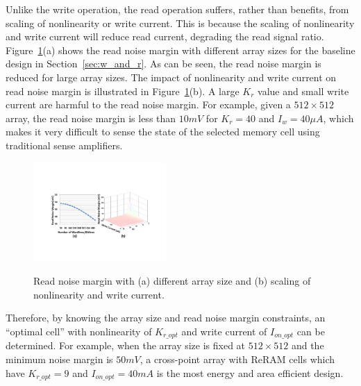 Unlike the write operation, the read operation suffers, rather than
benefits, from scaling of nonlinearity or write current. This is because
the scaling of nonlinearity and write current will reduce read current,
degrading the read signal ratio. Figure~\ref{fig:sense_margin}(a) shows
the read noise margin with different array sizes for the baseline design
in Section~\ref{sec:w_and_r}.  As can be seen, the read noise margin is
reduced for large array sizes. The impact of nonlinearity and write
current on read noise margin is illustrated in
Figure~\ref{fig:sense_margin}(b). A large $K_r$ value and small write
current are harmful to the read noise margin. For example, given a $512
\times 512$ array, the read noise margin is less than $10mV$ for $K_r=40$
and $I_w=40\mu A$, which makes it very difficult to sense the state of the
selected memory cell using traditional sense amplifiers.

\begin{figure}[!t]
\centering
  \includegraphics[width=0.45\textwidth]{./figures/read}\\\vspace{-5pt}
  \caption{Read noise margin with (a) different array size and (b) scaling of nonlinearity and write current.}\label{fig:sense_margin}
  \vspace{-15pt}
\end{figure}

Therefore, by knowing the array size and read noise margin constraints, an
``optimal cell'' with nonlinearity of $K_{r\_opt}$ and write current of
$I_{on\_opt}$ can be determined. For example, when the array size is fixed
at $512 \times 512$ and the minimum noise margin is $50mV$, a cross-point
array with ReRAM cells which have $K_{r\_opt} = 9$ and $I_{on\_opt} =
40mA$ is the most energy and area efficient design.


